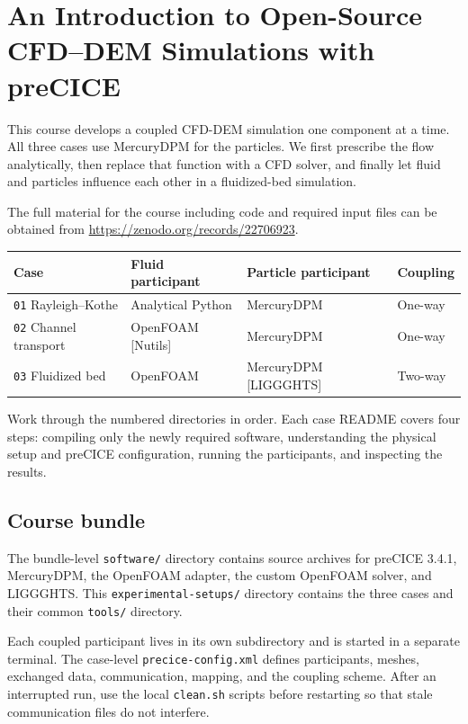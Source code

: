 \chapter[Open-source CFD--DEM with preCICE]{An Introduction to Open-Source CFD--DEM Simulations with preCICE}


This course develops a coupled CFD-DEM simulation one component at a
time. All three cases use MercuryDPM for the particles. We first
prescribe the flow analytically, then replace that function with a CFD
solver, and finally let fluid and particles influence each other in a
fluidized-bed simulation.

The full material for the course including code and required input files can be obtained from \url{https://zenodo.org/records/22706923}.

\begin{center}
\small
\begin{tabularx}{\linewidth}{@{}lXXX@{}}
\toprule
Case & Fluid participant & Particle participant & Coupling \\
\midrule
\nolinkurl{01} Rayleigh--Kothe & Analytical Python & MercuryDPM & One-way \\
\nolinkurl{02} Channel transport & OpenFOAM [Nutils] & MercuryDPM & One-way \\
\nolinkurl{03} Fluidized bed & OpenFOAM & MercuryDPM [LIGGGHTS] & Two-way \\
\bottomrule
\end{tabularx}
\end{center}

Work through the numbered directories in order. Each case README covers
four steps: compiling only the newly required software, understanding
the physical setup and preCICE configuration, running the participants,
and inspecting the results.

\section{Course bundle}\label{readmemd__course-bundle}

The bundle-level \nolinkurl{software/} directory contains source
archives for preCICE 3.4.1, MercuryDPM, the OpenFOAM adapter, the custom
OpenFOAM solver, and LIGGGHTS. This \nolinkurl{experimental-setups/}
directory contains the three cases and their common \nolinkurl{tools/}
directory.

Each coupled participant lives in its own subdirectory and is started in
a separate terminal. The case-level \nolinkurl{precice-config.xml}
defines participants, meshes, exchanged data, communication, mapping,
and the coupling scheme. After an interrupted run, use the local
\nolinkurl{clean.sh} scripts before restarting so that stale
communication files do not interfere.

